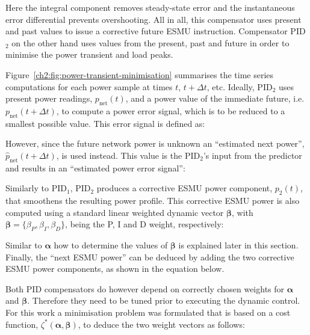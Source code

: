 

Here the integral component removes steady-state error and the instantaneous error differential prevents overshooting.
All in all, this compensator uses present and past values to issue a corrective future ESMU instruction.
Compensator PID$_2$ on the other hand uses values from the present, past and future in order to minimise the power transient and load peaks.



Figure~\ref{ch2:fig:power-transient-minimisation} summarises the time series computations for each power sample at times $t$, $t+\Delta t$, etc.
Ideally, PID$_2$ uses present power readings, $p_\text{net}(t)$, and a power value of the immediate future, i.e. $p_\text{net}(t+\Delta t)$, to compute a power error signal, which is to be reduced to a smallest possible value.
This error signal is defined as:



However, since the future network power is unknown an ``estimated next power'', $\hat{p}_\text{net}(t+\Delta t)$, is used instead.
This value is the PID$_2$'s input from the predictor and results in an ``estimated power error signal'':



Similarly to PID$_1$, PID$_2$ produces a corrective ESMU power component, $p_2(t)$, that smoothens the resulting power profile.
This corrective ESMU power is also computed using a standard linear weighted dynamic vector $\boldsymbol{\beta}$, with $\boldsymbol{\beta} = \{\beta_P, \beta_I, \beta_D\}$, being the P, I and D weight, respectively:



Similar to $\boldsymbol{\alpha}$ how to determine the values of $\boldsymbol{\beta}$ is explained later in this section.
Finally, the ``next ESMU power'' can be deduced by adding the two corrective ESMU power components, as shown in the equation below.



Both PID compensators do however depend on correctly chosen weights for $\boldsymbol{\alpha}$ and $\boldsymbol{\beta}$.
Therefore they need to be tuned prior to executing the dynamic control.
For this work a minimisation problem was formulated that is based on a cost function, $\zeta^*(\boldsymbol{\alpha}, \boldsymbol{\beta})$, to deduce the two weight vectors as follows:

